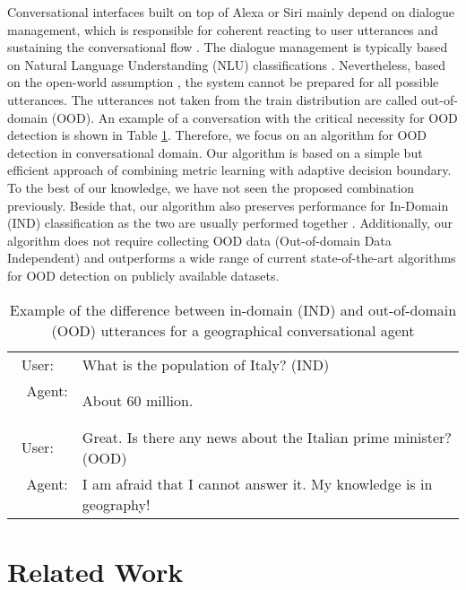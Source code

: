 \documentclass[runningheads]{llncs}
\begin{document}
Conversational interfaces built on top of Alexa or Siri mainly depend on dialogue management, which is responsible for coherent reacting to user utterances and sustaining the conversational flow \cite{conversation_agent_intro}. The dialogue management is typically based on Natural Language Understanding (NLU) classifications \cite{pichl2020alquist}. Nevertheless, based on the open-world assumption \cite{Keet2013_open_world_assumption}, the system cannot be prepared for all possible utterances. The utterances not taken from the train distribution are called out-of-domain (OOD). An example of a conversation with the critical necessity for OOD detection is shown in Table \ref{fig:example_of_ood_conversation2}. Therefore, we focus on an algorithm for OOD detection in conversational domain. Our algorithm is based on a simple but efficient approach of combining metric learning with adaptive decision boundary. To the best of our knowledge, we have not seen the proposed combination previously. Beside that, our algorithm also preserves performance for In-Domain (IND) classification as the two are usually performed together \cite{konrad2021alquist4}. Additionally, our algorithm does not require collecting OOD data (Out-of-domain Data Independent) and outperforms a wide range of current state-of-the-art algorithms for OOD detection on publicly available datasets. 











\begin{table}[t]\centering
\caption{Example of the difference between in-domain (IND) and out-of-domain (OOD) utterances for a geographical conversational agent}
\label{fig:example_of_ood_conversation2}
\begin{tabular}{rl}
User:  \,\,\,\, &  What is the population of Italy?    (IND)            \\
Agent: \,\,\,\, &  About 60 million. \\
User:  \,\,\,\, &  Great. Is there any news about the Italian prime minister? (OOD) \\
Agent: \,\,\,\, &  I am afraid that I cannot answer it. My knowledge is in geography!
\end{tabular}
\end{table}



\section{Related Work}
\end{document}
